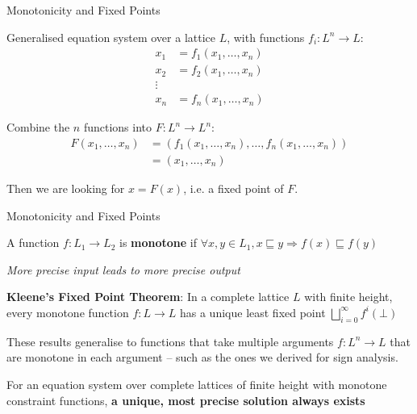 \documentclass[aspectratio=169,xcolor=dvipsnames]{beamer}
\begin{document}
\begin{frame}{Monotonicity and Fixed Points}

	Generalised equation system over a lattice $L$, with functions $f_i: L^n
		\rightarrow L$:
	\begin{align*}
		x_1 & = f_1(x_1, \ldots, x_n) \\
		x_2 & = f_2(x_1, \ldots, x_n) \\
		\vdots                        \\
		x_n & = f_n(x_1, \ldots, x_n)
	\end{align*}

	Combine the $n$ functions into $F: L^n \rightarrow L^n$:
	\begin{align*}
		F(x_1, \ldots, x_n) & = (f_1(x_1, \ldots, x_n), \ldots, f_n(x_1, \ldots, x_n)) \\
		                    & = (x_1, \ldots, x_n)
	\end{align*}

	Then we are looking for $x = F(x)$, i.e. a fixed point of $F$.
\end{frame}


\begin{frame}{Monotonicity and Fixed Points}

	\begin{definition}
		A function $f: L_1 \rightarrow L_2$ is {\bf monotone} if $\forall x, y \in L_1, x \sqsubseteq y \Rightarrow$$ f(x)
		\sqsubseteq f(y)$
	\end{definition}

	{\it More precise input leads to more precise output}

	\begin{theorem}
		{\bf Kleene's Fixed Point Theorem}: In a complete lattice $L$ with finite height,
		every monotone function $f: L \rightarrow L$ has a unique least fixed point
		$\bigsqcup_{i=0}^{\infty} f^i(\bot)$
	\end{theorem}

	These results generalise to functions that take multiple arguments $f: L^n
		\rightarrow L$ that are monotone in each argument -- such as the ones we
	derived for sign analysis.

	\begin{corollary}
		For an equation system over complete lattices of finite height with monotone constraint functions,
		{\bf a unique, most precise solution always exists}
	\end{corollary}
\end{frame}
\end{document}
